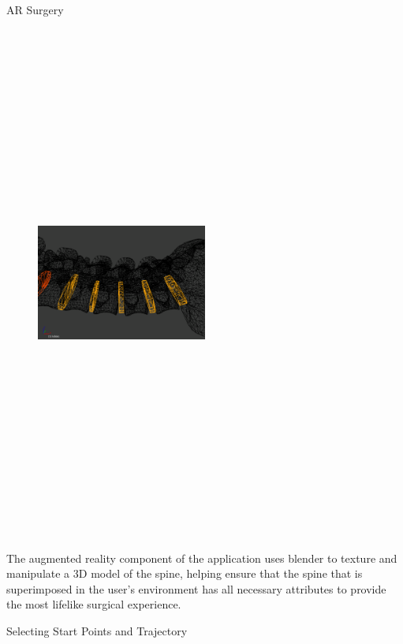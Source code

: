 \documentclass[final]{beamer}
\newlength{\onecolwid}
\begin{document}
\begin{frame}[t]
\begin{columns}[t]
\begin{column}{\onecolwid}
\begin{block}{\LARGE AR Surgery}
\begin{figure}
\centering
\includegraphics[width=0.5\textwidth,height=17cm]{spine.png}

\end{figure}
\large
The augmented reality component of the application uses blender to texture and manipulate a 3D model of the spine, helping ensure that the spine that is superimposed in the user's environment has all necessary attributes to provide the most lifelike surgical experience.

\end{block}


\begin{block}{\LARGE Selecting Start Points and Trajectory}


\end{block}
\end{column}
\end{columns}
\end{frame}
\end{document}
